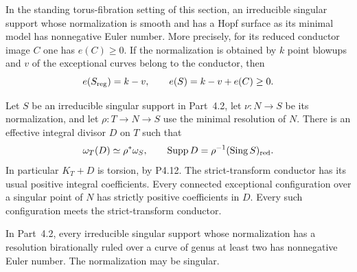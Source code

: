 
\begin{proposition}[P4R.5]\hypertarget{tag-02YH}{}\label{night:P4R.5}\label{stmt:P4R.5}


In the standing torus-fibration setting of this section, an irreducible singular
support whose normalization is smooth and has a Hopf
surface as its minimal model has nonnegative Euler
number. More precisely, for its reduced conductor
image $C$ one has $e(C)\ge0$. If the normalization is
obtained by $k$ point blowups and $v$ of the exceptional
curves belong to the conductor, then
\[
 e(S_{\rm reg})=k-v,\qquad
 e(S)=k-v+e(C)\ge0.
\]
\end{proposition}

\begin{proposition}[P4R.6]\hypertarget{tag-02YI}{}\label{night:P4R.6}\label{stmt:P4R.6}


Let $S$ be an irreducible singular support in
Part~4.2, let $\nu:N\to S$ be its normalization,
and let $\rho:T\to N\to S$ use the minimal
resolution of $N$. There is an effective integral
divisor $D$ on $T$ such that
\[
 \omega_T(D)\simeq\rho^*\omega_S,
 \qquad \operatorname{Supp}D
       =\rho^{-1}(\operatorname{Sing}S)_{\rm red}.
\]
In particular $K_T+D$ is torsion, by P4.12.
The strict-transform conductor has its usual
positive integral coefficients. Every connected
exceptional configuration over a singular point
of $N$ has strictly positive coefficients in $D$.
Every such configuration meets the strict-transform
conductor.
\end{proposition}

\begin{proposition}[P4R.7]\hypertarget{tag-02YJ}{}\label{night:P4R.7}\label{stmt:P4R.7}


In Part~4.2, every irreducible singular
support whose normalization has a
resolution birationally ruled over a
curve of genus at least two has
nonnegative Euler number. The
normalization may be singular.
\end{proposition}

